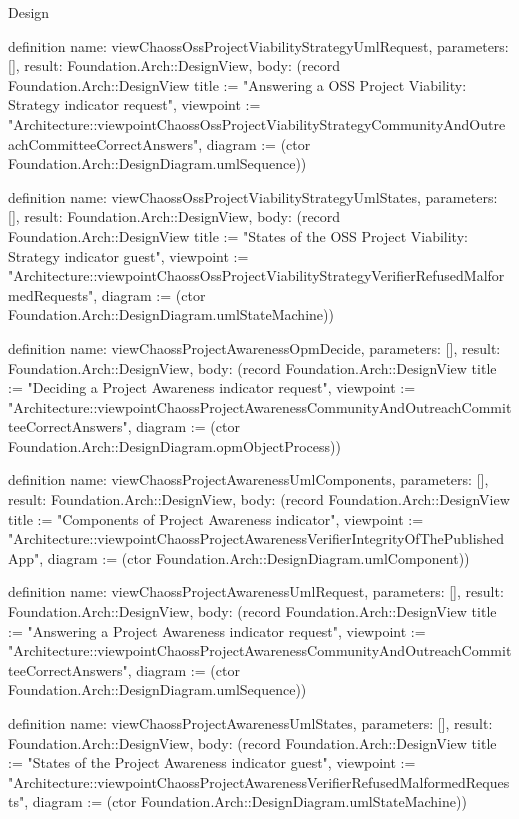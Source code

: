 \begin{lexlean}{Design}
\begin{semanticmodule}
definition{
  name: viewChaossOssProjectViabilityStrategyUmlRequest,
  parameters: [],
  result: Foundation.Arch::DesignView,
  body: (record Foundation.Arch::DesignView {title := "Answering a OSS Project Viability: Strategy indicator request", viewpoint := "Architecture::viewpointChaossOssProjectViabilityStrategyCommunityAndOutreachCommitteeCorrectAnswers", diagram := (ctor Foundation.Arch::DesignDiagram.umlSequence)})
}

definition{
  name: viewChaossOssProjectViabilityStrategyUmlStates,
  parameters: [],
  result: Foundation.Arch::DesignView,
  body: (record Foundation.Arch::DesignView {title := "States of the OSS Project Viability: Strategy indicator guest", viewpoint := "Architecture::viewpointChaossOssProjectViabilityStrategyVerifierRefusedMalformedRequests", diagram := (ctor Foundation.Arch::DesignDiagram.umlStateMachine)})
}

definition{
  name: viewChaossProjectAwarenessOpmDecide,
  parameters: [],
  result: Foundation.Arch::DesignView,
  body: (record Foundation.Arch::DesignView {title := "Deciding a Project Awareness indicator request", viewpoint := "Architecture::viewpointChaossProjectAwarenessCommunityAndOutreachCommitteeCorrectAnswers", diagram := (ctor Foundation.Arch::DesignDiagram.opmObjectProcess)})
}

definition{
  name: viewChaossProjectAwarenessUmlComponents,
  parameters: [],
  result: Foundation.Arch::DesignView,
  body: (record Foundation.Arch::DesignView {title := "Components of Project Awareness indicator", viewpoint := "Architecture::viewpointChaossProjectAwarenessVerifierIntegrityOfThePublishedApp", diagram := (ctor Foundation.Arch::DesignDiagram.umlComponent)})
}

definition{
  name: viewChaossProjectAwarenessUmlRequest,
  parameters: [],
  result: Foundation.Arch::DesignView,
  body: (record Foundation.Arch::DesignView {title := "Answering a Project Awareness indicator request", viewpoint := "Architecture::viewpointChaossProjectAwarenessCommunityAndOutreachCommitteeCorrectAnswers", diagram := (ctor Foundation.Arch::DesignDiagram.umlSequence)})
}

definition{
  name: viewChaossProjectAwarenessUmlStates,
  parameters: [],
  result: Foundation.Arch::DesignView,
  body: (record Foundation.Arch::DesignView {title := "States of the Project Awareness indicator guest", viewpoint := "Architecture::viewpointChaossProjectAwarenessVerifierRefusedMalformedRequests", diagram := (ctor Foundation.Arch::DesignDiagram.umlStateMachine)})
}


\end{semanticmodule}
\end{lexlean}
